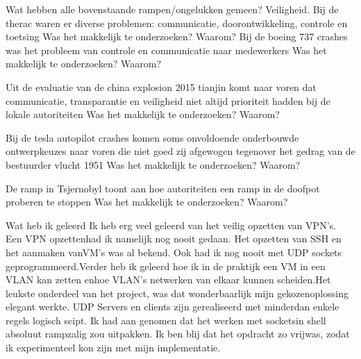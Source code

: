 
Wat hebben alle bovenstaande rampen/ongelukken gemeen? Veiligheid.
Bij de therac waren er diverse problemen: communicatie, doorontwikkeling, controle en toetsing
Was het makkelijk te onderzoeken? Waarom?
Bij de boeing 737 crashes was het probleem van controle en communicatie naar medewerkers
Was het makkelijk te onderzoeken? Waarom?

Uit de evaluatie van de china explosion 2015 tianjin komt naar voren dat communicatie, transparantie en veiligheid niet altijd prioriteit hadden bij de lokale autoriteiten
Was het makkelijk te onderzoeken? Waarom?

Bij de tesla autopilot crashes komen soms onvoldoende onderbouwde ontwerpkeuzes naar voren die niet goed zij  afgewogen tegenover het gedrag van de bestuurder
vlucht 1951
Was het makkelijk te onderzoeken? Waarom?

De ramp in Tsjernobyl toont aan hoe autoriteiten een ramp in de doofpot proberen te stoppen
Was het makkelijk te onderzoeken? Waarom?



Wat heb ik geleerd
Ik heb erg veel geleerd van het veilig opzetten van VPN’s. Een VPN opzettenhad ik namelijk nog nooit gedaan. Het opzetten van SSH en het aanmaken vanVM’s was al bekend. Ook had ik nog nooit met UDP sockets geprogrammeerd.Verder heb ik geleerd hoe ik in de praktijk een VM in een VLAN kan zetten enhoe VLAN’s netwerken van elkaar kunnen scheiden.Het leukste onderdeel van het project, was dat wonderbaarlijk mijn gekozenoplossing elegant werkte. UDP Servers en clients zijn gerealiseerd met minderdan enkele regels logisch scipt. Ik had aan genomen dat het werken met socketsin shell absoluut rampzalig zou uitpakken. Ik ben blij dat het opdracht zo vrijwas, zodat ik experimenteel kon zijn met mijn implementatie.



